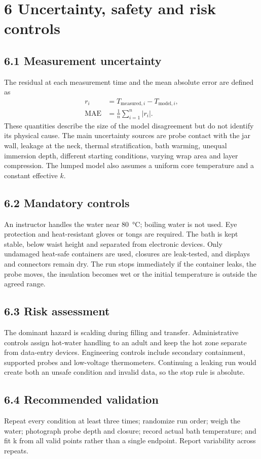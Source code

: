 \documentclass[9pt,a4paper]{extarticle}
\begin{document}
\section*{6 Uncertainty, safety and risk controls}
\subsection*{6.1 Measurement uncertainty}
The residual at each measurement time and the mean absolute error are defined as
\begin{align}
  r_i &= T_{\mathrm{measured},i}-T_{\mathrm{model},i},\\
  \mathrm{MAE} &= \frac{1}{n}\sum_{i=1}^{n}\lvert r_i\rvert.
\end{align}
These quantities describe the size of the model disagreement but do not identify its physical cause. The main uncertainty sources are probe contact with the jar wall, leakage at the neck, thermal stratification, bath warming, unequal immersion depth, different starting conditions, varying wrap area and layer compression. The lumped model also assumes a uniform core temperature and a constant effective $k$.

\subsection*{6.2 Mandatory controls}
An instructor handles the water near \SI{80}{\celsius}; boiling water is not used. Eye protection and heat-resistant gloves or tongs are required. The bath is kept stable, below waist height and separated from electronic devices. Only undamaged heat-safe containers are used, closures are leak-tested, and displays and connectors remain dry. The run stops immediately if the container leaks, the probe moves, the insulation becomes wet or the initial temperature is outside the agreed range.

\subsection*{6.3 Risk assessment}
The dominant hazard is scalding during filling and transfer. Administrative controls assign hot-water handling to an adult and keep the hot zone separate from data-entry devices. Engineering controls include secondary containment, supported probes and low-voltage thermometers. Continuing a leaking run would create both an unsafe condition and invalid data, so the stop rule is absolute.

\subsection*{6.4 Recommended validation}
Repeat every condition at least three times; randomize run order; weigh the water; photograph probe depth and closure; record actual bath temperature; and fit k from all valid points rather than a single endpoint. Report variability across repeats.
\end{document}
